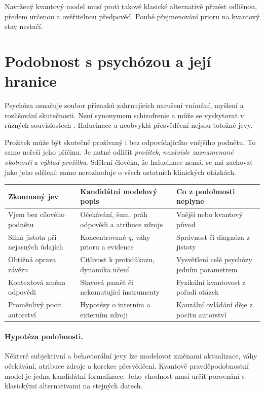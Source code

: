 \documentclass[11pt,a4paper]{article}
\begin{document}
Navržený kvantový model musí proti takové klasické alternativě přinést odlišnou, předem určenou a ověřitelnou předpověď. Pouhé přejmenování prioru na kvantový stav nestačí.

\newpage
\section{Podobnost s psychózou a její hranice}
Psychóza označuje soubor příznaků zahrnujících narušení vnímání, myšlení a rozlišování skutečnosti. Není synonymem schizofrenie a může se vyskytovat v různých souvislostech \cite{nimh}.
Halucinace a neobvyklá přesvědčení nejsou totožné jevy.

Prožitek může být skutečně prožívaný i bez odpovídajícího vnějšího podnětu. To samo neřeší jeho příčinu. Je nutné odlišit \emph{prožitek}, \emph{nezávisle zaznamenané okolnosti} a \emph{výklad prožitku}.
Sdělení člověka, že halucinace nemá, se má zachovat jako jeho sdělení; samo nerozhoduje o všech ostatních klinických otázkách.

\small
\noindent\begin{tabularx}{\textwidth}{@{}p{}XX@{}}
\toprule
Zkoumaný jev & Kandidátní modelový popis & Co z podobnosti neplyne\\
\midrule
Vjem bez cílového podnětu & Očekávání, šum, práh odpovědi a atribuce zdroje & Vnější nebo kvantový původ\\
Silná jistota při nejasných údajích & Koncentrované $q$, váhy prioru a evidence & Správnost či diagnóza z jistoty\\
Obtížná oprava závěru & Citlivost k protidůkazu, dynamika učení & Vysvětlení celé psychózy jedním parametrem\\
Kontextová změna odpovědi & Stavová paměť či nekomutující instrumenty & Fyzikální kvantovost z pořadí otázek\\
Proměnlivý pocit autorství & Hypotézy o interním a externím zdroji & Kauzální ovládání děje z pocitu autorství\\
\bottomrule
\end{tabularx}
\normalsize

\paragraph{Hypotéza podobnosti.}
Některé subjektivní a behaviorální jevy lze modelovat změnami aktualizace, váhy očekávání, atribuce zdroje a korekce přesvědčení. Kvantově pravděpodobnostní model je jedna kandidátní formalizace. Jeho vhodnost musí určit porovnání s klasickými alternativami na stejných datech.
\end{document}
